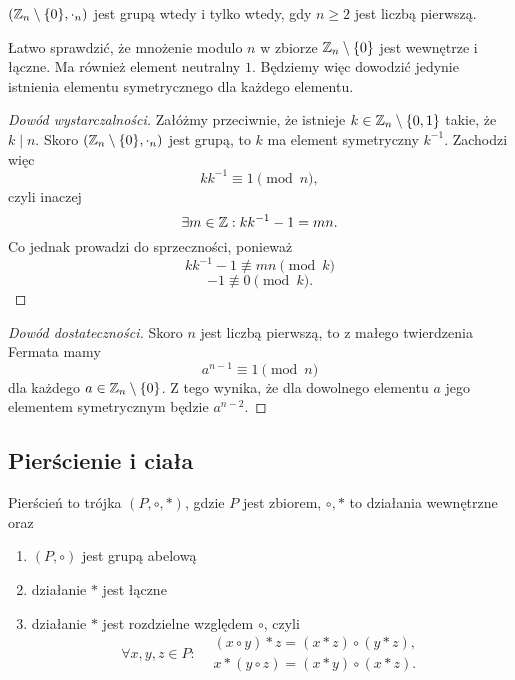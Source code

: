 \documentclass[11pt]{scrartcl}
\begin{document}
    \begin{theorem}
        \label{t:prime_n->group}
        $(\mathbb Z_n \setminus \{0\}, \cdot_n)$ jest grupą wtedy i tylko wtedy, gdy $n \geq 2$ jest liczbą pierwszą.
    \end{theorem}
    Łatwo sprawdzić, że mnożenie modulo $n$ w zbiorze $\mathbb Z_n \setminus \{0\}$ jest wewnętrze i łączne. Ma również element neutralny $1$. Będziemy więc dowodzić jedynie istnienia elementu symetrycznego dla każdego elementu.
    \begin{proof}[Dowód wystarczalności]\renewcommand{\qedsymbol}{}
        Załóżmy przeciwnie, że istnieje $k \in \mathbb Z_n \setminus \{0, 1\}$ takie, że $k \mid n$. Skoro $(\mathbb Z_n \setminus \{0\}, \cdot_n)$ jest grupą, to $k$ ma element symetryczny $k^{-1}$. Zachodzi więc
        $$ kk^{-1} \equiv 1 \pmod{n}, $$
        czyli inaczej
        $$ \exists m \in \mathbb Z : kk^{-1} - 1 = mn. $$
        Co jednak prowadzi do sprzeczności, ponieważ
        $$ kk^{-1} - 1 \not\equiv mn \pmod{k} $$
        $$ - 1 \not\equiv 0 \pmod{k}. $$
    \end{proof}
    \begin{proof}[Dowód dostateczności]
        Skoro $n$ jest liczbą pierwszą, to z małego twierdzenia Fermata mamy
        $$ a^{n-1} \equiv 1 \pmod{n} $$
        dla każdego $a \in \mathbb Z_n \setminus \{0\}$.
        Z tego wynika, że dla dowolnego elementu $a$ jego elementem symetrycznym będzie $a^{n-2}$.
    \end{proof}

    \subsection{Pierścienie i ciała}
    \begin{definition}
        Pierścień to trójka $(P, \circ, *)$, gdzie $P$ jest zbiorem, $\circ, *$ to działania wewnętrzne oraz
        \begin{enumerate}
            \item $(P, \circ)$ jest grupą abelową
            \item działanie $*$ jest łączne
            \item działanie $*$ jest rozdzielne względem $\circ$, czyli
            $$\forall x, y, z \in P : \begin{aligned}& (x \circ y) * z = (x * z) \circ (y * z), \\
                                                     & x * (y \circ z) = (x * y) \circ (x * z).\end{aligned} $$
        \end{enumerate}
    \end{definition}
\end{document}
